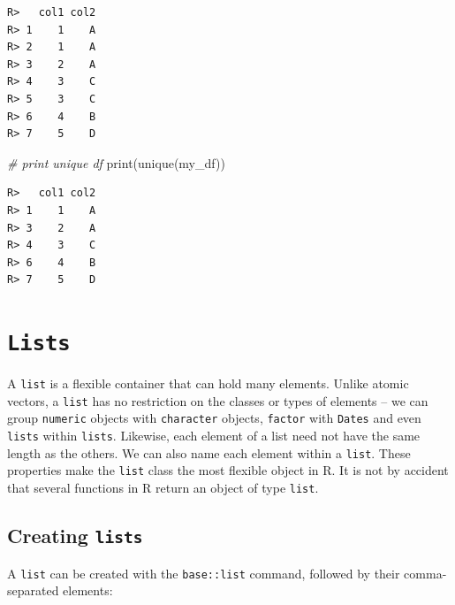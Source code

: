 \documentclass[
  12pt,
]{book}
\newenvironment{Shaded}{\begin{snugshade}}{\end{snugshade}}
\newcommand{\CommentTok}[1]{\textcolor[rgb]{0.37,0.37,0.37}{\textit{#1}}}
\newcommand{\FunctionTok}[1]{\textcolor[rgb]{0,0,0}{#1}}
\newcommand{\NormalTok}[1]{#1}
\begin{document}
\begin{verbatim}
R>   col1 col2
R> 1    1    A
R> 2    1    A
R> 3    2    A
R> 4    3    C
R> 5    3    C
R> 6    4    B
R> 7    5    D
\end{verbatim}

\begin{Shaded}
\begin{Highlighting}[]
\CommentTok{\# print unique df}
\FunctionTok{print}\NormalTok{(}\FunctionTok{unique}\NormalTok{(my\_df))}
\end{Highlighting}
\end{Shaded}

\begin{verbatim}
R>   col1 col2
R> 1    1    A
R> 3    2    A
R> 4    3    C
R> 6    4    B
R> 7    5    D
\end{verbatim}

\hypertarget{lists}{%
\section{\texorpdfstring{\texttt{Lists}}{Lists}}\label{lists}}

A \texttt{list} is a flexible container that can hold many elements. Unlike atomic vectors, a \texttt{list} has no restriction on the classes or types of elements -- we can group \texttt{numeric} objects with \texttt{character} objects, \texttt{factor} with \texttt{Dates} and even \texttt{lists} within \texttt{lists}. Likewise, each element of a list need not have the same length as the others. We can also name each element within a \texttt{list}. These properties make the \texttt{list} class the most flexible object in R. It is not by accident that several functions in R return an object of type \texttt{list}. 

\hypertarget{creating-lists}{%
\subsection{\texorpdfstring{Creating \texttt{lists}}{Creating lists}}\label{creating-lists}}

A \texttt{list} can be created with the \texttt{base::list} command, followed by their comma-separated elements: 
\end{document}
